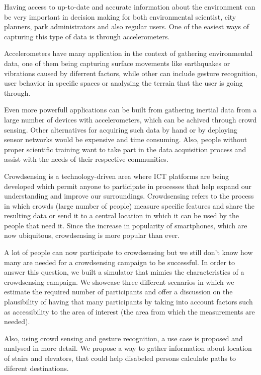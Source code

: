 
Having access to up-to-date and accurate information about the environment can 
be very important in decision making for both environmental scientist, city planners, 
park administrators and also regular users. One of the easiest ways of capturing this type of data is through accelerometers.

Accelerometers have many application in the context of gathering environmental data, one of them being capturing
surface movements like earthquakes or vibrations caused by diferrent 
factors, while other can include gesture recognition, user behavior
in specific spaces or analysing the terrain that the user is going through.

Even more powerfull applications can be built from gathering inertial data from
a large number of devices with accelerometers, which can be achived
 through crowd sensing. Other alternatives for acquiring such data by hand
or by deploying sensor networks would be expensive and time consuming.
Also, people without proper scientific
training want to take part in the data acquisition process and assist
with the needs of their respective communities.


Crowdsensing is a
technology-driven area where ICT platforms are being developed
which permit anyone to participate in processes that help expand
our understanding and improve our surroundings. Crowdsensing
refers to the process in which crowds (large number of people)
measure specific features and share the resulting data or send it
to a central location in which it can be used by the people that
need it. Since the
increase in popularity of smartphones, which are now ubiquitous,
crowdsensing is more popular than ever.

A lot of people can now participate to crowdsensing but we still
don’t know how many are needed for a crowdsensing campaign
to be successful. In order to answer this question, we built a
simulator that mimics the characteristics of a crowdsensing campaign.
 We showcase three different scenarios in which we estimate
the required number of participants and offer a discussion on
the plausibility of having that many participants by taking into
account factors such as accessibility to the area of interest (the
area from which the measurements are needed).

Also, using crowd sensing and gesture recognition, a use case is proposed and analysed in more
 detail. We propose a way to gather information about location
 of stairs and elevators, that could help disabeled
 persons calculate paths to diferent destinations.

